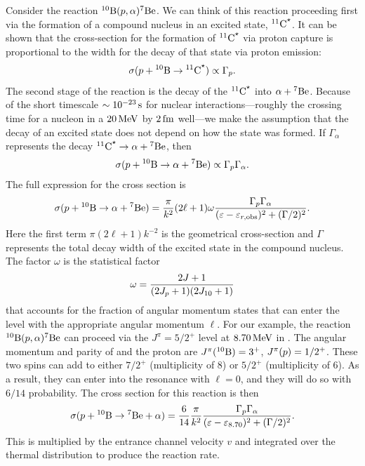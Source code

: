 Consider the reaction $\boron[10](\pt,\alpha)\beryllium[7]$. We can think of this reaction proceeding first via the formation of a compound nucleus in an excited state, $\carbon[11]^{\star}$. It can be shown that the cross-section for the formation of $\carbon[11]^{\star}$ via proton capture is proportional to the width for the decay of that state via proton emission: 
\begin{equation}\label{e.reciprocity}
\sigma(\pt + \boron[10]\to \carbon[11]^{\star}) \propto \Gamma_{\pt}.
\end{equation}
The second stage of the reaction is the decay of the $\carbon[11]^{\star}$ into $\alpha + \beryllium[7]$.
Because of the short timescale $\sim 10^{-23}\nsp\second$ for nuclear interactions---roughly the crossing time for a nucleon in a $20\nsp\MeV$ by $2\nsp\fermi$ well---we make the assumption that the decay of an excited state does not depend on how the state was formed. If $\Gamma_{\alpha}$ represents the decay $\carbon[11]^{\star}\to \alpha+\beryllium[7]$, then
\[ \sigma(\pt + \boron[10] \to \alpha+\beryllium[7]) \propto \Gamma_{\pt}\Gamma_{\alpha}. \]
The full expression for the cross section is
\begin{equation}\label{e.resonant-cross-section}
 \sigma(\pt + \boron[10] \to \alpha+\beryllium[7])  = \frac{\pi}{k^{2}}(2\ell + 1)\omega\frac{\Gamma_{\pt}\Gamma_{\alpha}}{(\varepsilon - \varepsilon_{r,\mathrm{obs}})^{2} + (\Gamma/2)^{2}}.
\end{equation}
Here the first term $\pi(2\ell+1)k^{-2}$ is the geometrical cross-section and $\Gamma$ represents the total decay width of the excited state in the compound nucleus.  The factor $\omega$  is the statistical factor
\[
\omega = \frac{2J + 1}{(2J_{\pt}+1)(2J_{10}+1)}
\]
that accounts for the fraction of angular momentum states that can enter the level with the appropriate angular momentum $\ell$.
For our example, the reaction $\boron[10](\pt,\alpha)\beryllium[7]$ can proceed via  the $J^{\pi} = 5/2^{+}$ level at $8.70\nsp\MeV$ in \carbon[11].  The angular momentum and parity of \boron[10] and the proton are $J^{\pi}(\boron[10]) = 3^{+}$, $J^{\pi}(\pt) = 1/2^{+}$.  These two spins can add to either $7/2^{+}$ (multiplicity of 8) or $5/2^{+}$ (multiplicity of 6).  As a result, they can enter into the resonance with $\ell = 0$, and they will do so with $6/14$ probability.  The cross section for this reaction is then
\[
\sigma(\pt + \boron[10]\to\beryllium[7]+\alpha) = \frac{6}{14}\frac{\pi}{k^{2}}\frac{\Gamma_{\pt}\Gamma_{\alpha}}{(\varepsilon-\varepsilon_{8.70})^{2} + (\Gamma/2)^{2}}.
\]
This is multiplied by the entrance channel velocity $v$ and integrated over the thermal distribution to produce the reaction rate.

